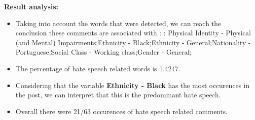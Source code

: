 \documentclass[11pt]{article}
\begin{document}
\textbf{\Large Result analysis:}

\begin{itemize}\item Taking into account the words that were detected, we can reach the conclusion these comments are associated with : : Physical Identity - Physical (and Mental) Impairments;Ethnicity - Black;Ethnicity - General;Nationality - Portuguese;Social Class - Working class;Gender - General;%

\item The percentage of hate speech related words is 1.4247.

\item Considering that the variable \textbf{Ethnicity - Black} has the most occurences in the post, we can interpret that this is the predominant hate speech.

\item Overall there were 21/63 occurences of hate speech related comments.\end{itemize}
\end{document}
